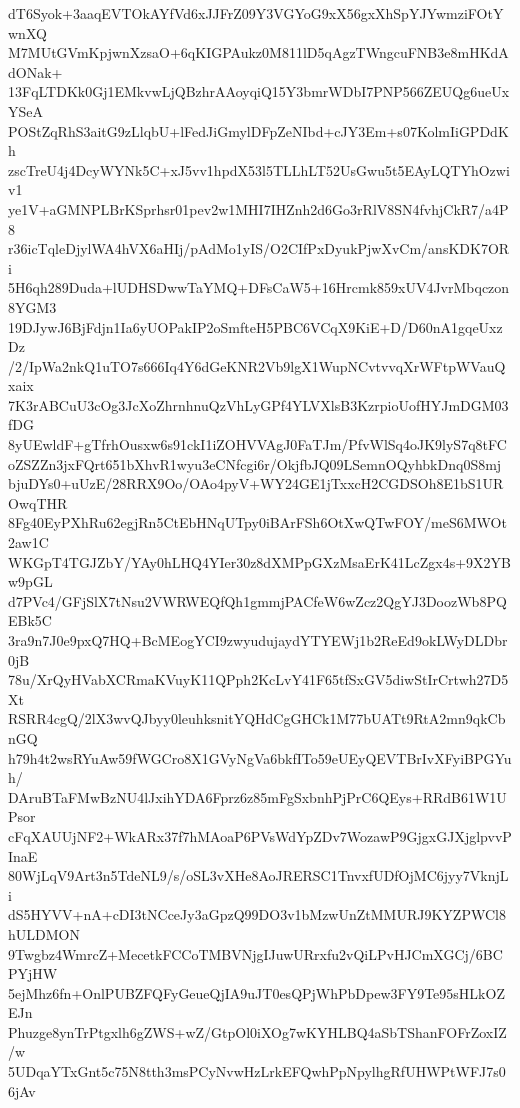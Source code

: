 dT6Syok+3aaqEVTOkAYfVd6xJJFrZ09Y3VGYoG9xX56gxXhSpYJYwmziFOtYwnXQ
M7MUtGVmKpjwnXzsaO+6qKIGPAukz0M811lD5qAgzTWngcuFNB3e8mHKdAdONak+
13FqLTDKk0Gj1EMkvwLjQBzhrAAoyqiQ15Y3bmrWDbI7PNP566ZEUQg6ueUxYSeA
POStZqRhS3aitG9zLlqbU+lFedJiGmylDFpZeNIbd+cJY3Em+s07KolmIiGPDdKh
zscTreU4j4DcyWYNk5C+xJ5vv1hpdX53l5TLLhLT52UsGwu5t5EAyLQTYhOzwiv1
ye1V+aGMNPLBrKSprhsr01pev2w1MHI7IHZnh2d6Go3rRlV8SN4fvhjCkR7/a4P8
r36icTqleDjylWA4hVX6aHIj/pAdMo1yIS/O2CIfPxDyukPjwXvCm/ansKDK7ORi
5H6qh289Duda+lUDHSDwwTaYMQ+DFsCaW5+16Hrcmk859xUV4JvrMbqczon8YGM3
19DJywJ6BjFdjn1Ia6yUOPakIP2oSmfteH5PBC6VCqX9KiE+D/D60nA1gqeUxzDz
/2/IpWa2nkQ1uTO7s666Iq4Y6dGeKNR2Vb9lgX1WupNCvtvvqXrWFtpWVauQxaix
7K3rABCuU3cOg3JcXoZhrnhnuQzVhLyGPf4YLVXlsB3KzrpioUofHYJmDGM03fDG
8yUEwldF+gTfrhOusxw6s91ckI1iZOHVVAgJ0FaTJm/PfvWlSq4oJK9lyS7q8tFC
oZSZZn3jxFQrt651bXhvR1wyu3eCNfcgi6r/OkjfbJQ09LSemnOQyhbkDnq0S8mj
bjuDYs0+uUzE/28RRX9Oo/OAo4pyV+WY24GE1jTxxcH2CGDSOh8E1bS1UROwqTHR
8Fg40EyPXhRu62egjRn5CtEbHNqUTpy0iBArFSh6OtXwQTwFOY/meS6MWOt2aw1C
WKGpT4TGJZbY/YAy0hLHQ4YIer30z8dXMPpGXzMsaErK41LcZgx4s+9X2YBw9pGL
d7PVc4/GFjSlX7tNsu2VWRWEQfQh1gmmjPACfeW6wZcz2QgYJ3DoozWb8PQEBk5C
3ra9n7J0e9pxQ7HQ+BcMEogYCI9zwyudujaydYTYEWj1b2ReEd9okLWyDLDbr0jB
78u/XrQyHVabXCRmaKVuyK11QPph2KcLvY41F65tfSxGV5diwStIrCrtwh27D5Xt
RSRR4cgQ/2lX3wvQJbyy0leuhksnitYQHdCgGHCk1M77bUATt9RtA2mn9qkCbnGQ
h79h4t2wsRYuAw59fWGCro8X1GVyNgVa6bkfITo59eUEyQEVTBrIvXFyiBPGYuh/
DAruBTaFMwBzNU4lJxihYDA6Fprz6z85mFgSxbnhPjPrC6QEys+RRdB61W1UPsor
cFqXAUUjNF2+WkARx37f7hMAoaP6PVsWdYpZDv7WozawP9GjgxGJXjglpvvPInaE
80WjLqV9Art3n5TdeNL9/s/oSL3vXHe8AoJRERSC1TnvxfUDfOjMC6jyy7VknjLi
dS5HYVV+nA+cDI3tNCceJy3aGpzQ99DO3v1bMzwUnZtMMURJ9KYZPWCl8hULDMON
9Twgbz4WmrcZ+MecetkFCCoTMBVNjgIJuwURrxfu2vQiLPvHJCmXGCj/6BCPYjHW
5ejMhz6fn+OnlPUBZFQFyGeueQjIA9uJT0esQPjWhPbDpew3FY9Te95sHLkOZEJn
Phuzge8ynTrPtgxlh6gZWS+wZ/GtpOl0iXOg7wKYHLBQ4aSbTShanFOFrZoxIZ/w
5UDqaYTxGnt5c75N8tth3msPCyNvwHzLrkEFQwhPpNpylhgRfUHWPtWFJ7s06jAv
